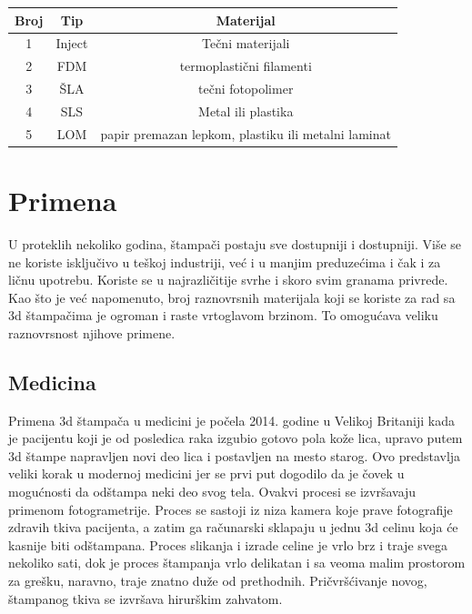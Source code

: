 \documentclass[a4paper]{article}
\begin{document}
{\begin{center}
\begin{tabular}{||c c c ||} 
 \hline
 Broj & Tip  & Materijal \\ [1ex] 
 \hline\hline
 1 & Inject  & Tečni materijali \\ 
 \hline
 2 & FDM & termoplastični filamenti \\
 \hline
 3 & ŠLA & tečni fotopolimer\\
 \hline
 4 & SLS & Metal ili plastika\\
 \hline
 5 & LOM & papir premazan lepkom, plastiku ili metalni laminat\\ [1ex] 
 \hline
\end{tabular}
\end{center}

\newpage

\section{Primena}
\label{sec:Primena}

U proteklih nekoliko godina, štampači postaju sve dostupniji i dostupniji. Više se ne koriste isključivo u teškoj industriji, već i u manjim preduzećima i čak i za ličnu upotrebu. Koriste se u najrazličitije svrhe i skoro svim granama privrede. Kao što je već napomenuto, broj raznovrsnih materijala koji se koriste za rad sa 3d štampačima je ogroman i raste vrtoglavom brzinom. To omogućava veliku raznovrsnost njihove primene. 

\subsection{Medicina}
\label{subsec:podnaslov6}

Primena 3d štampača u medicini je počela 2014. godine u Velikoj Britaniji kada je pacijentu koji je od posledica raka izgubio gotovo pola kože lica, upravo putem 3d štampe napravljen novi deo lica i postavljen na mesto starog. Ovo predstavlja veliki korak u modernoj medicini jer se prvi put dogodilo da je čovek u mogućnosti da odštampa neki deo svog tela. 
\bigbreak Ovakvi procesi se izvršavaju primenom fotogrametrije. Proces se sastoji iz niza kamera koje prave fotografije zdravih tkiva pacijenta, a zatim ga računarski sklapaju u jednu 3d celinu koja će kasnije biti odštampana. Proces slikanja i izrade celine je vrlo brz i traje svega nekoliko sati, dok je proces štampanja vrlo delikatan i sa veoma malim prostorom za grešku, naravno, traje znatno duže od prethodnih. Pričvršćivanje novog, štampanog tkiva se izvršava hirurškim zahvatom.

}
\end{document}
